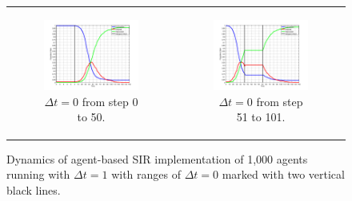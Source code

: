 \begin{figure}
\begin{center}
	\begin{tabular}{c c}
		\begin{subfigure}[b]{0.5\textwidth}
			\centering
			\includegraphics[width=.8\textwidth, angle=0]{./shared/fig/dtzero/SIR_ABS_zeroDt_start.png}
			\caption{$\Delta t = 0$ from step 0 to 50.}
			\label{fig:sd_plot_10dt}
		\end{subfigure}
	
		& 
		
		\begin{subfigure}[b]{0.5\textwidth}
			\centering
			\includegraphics[width=.8\textwidth, angle=0]{./shared/fig/dtzero/SIR_ABS_zeroDt_mid.png}
			\caption{$\Delta t = 0$ from step 51 to 101.}
			\label{fig:sd_plot_0.01dt}
		\end{subfigure}
	\end{tabular}
	
	\caption{Dynamics of agent-based SIR implementation of 1,000 agents running with $\Delta t = 1$ with ranges of $\Delta t = 0$ marked with two vertical black lines.}
	\label{fig:sir_abs_zero_dt}
\end{center}
\end{figure}

